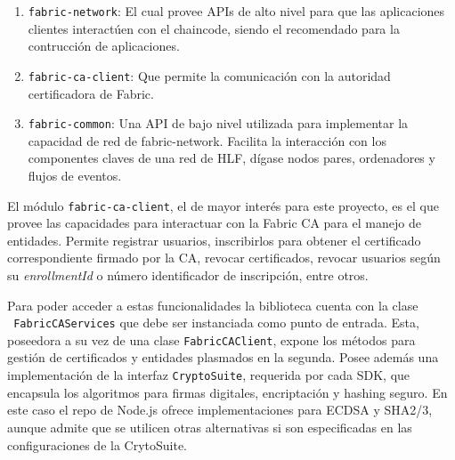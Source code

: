 \begin{enumerate}
	\item \texttt{fabric-network}: El cual provee APIs de alto nivel para que las aplicaciones clientes interact\'uen con el chaincode, siendo el recomendado para la contrucci\'on de aplicaciones.
	
	\item \texttt{fabric-ca-client}: Que permite la comunicaci\'on con la autoridad certificadora de Fabric.
	
	\item \texttt{fabric-common}: Una API de bajo nivel utilizada para implementar la capacidad de red de fabric-network. Facilita la interacci\'on con los componentes claves de una red de HLF, d\'igase nodos pares, ordenadores y flujos de eventos.
\end{enumerate}


El m\'odulo \texttt{fabric-ca-client}, el de mayor inter\'es para este proyecto, es el que provee las capacidades para interactuar con la Fabric CA para el manejo de entidades.  Permite registrar usuarios, inscribirlos para obtener el certificado correspondiente firmado por la CA,  revocar certificados, revocar usuarios seg\'un su \emph{enrollmentId} o n\'umero identificador de inscripci\'on, entre otros.

Para poder acceder a estas funcionalidades la biblioteca cuenta con la clase 
\\
\texttt{ FabricCAServices} que debe ser instanciada como punto de entrada. Esta, poseedora a su vez de una clase \texttt{FabricCAClient}, expone los m\'etodos para gesti\'on de certificados y entidades plasmados en la segunda. Posee adem\'as una implementaci\'on de la interfaz \texttt{CryptoSuite}, requerida por cada SDK, que encapsula los algoritmos para firmas digitales, encriptaci\'on y hashing seguro. En este caso el repo de Node.js ofrece implementaciones para ECDSA y SHA2/3, aunque admite que se utilicen otras alternativas si son especificadas en las configuraciones de la CrytoSuite.




